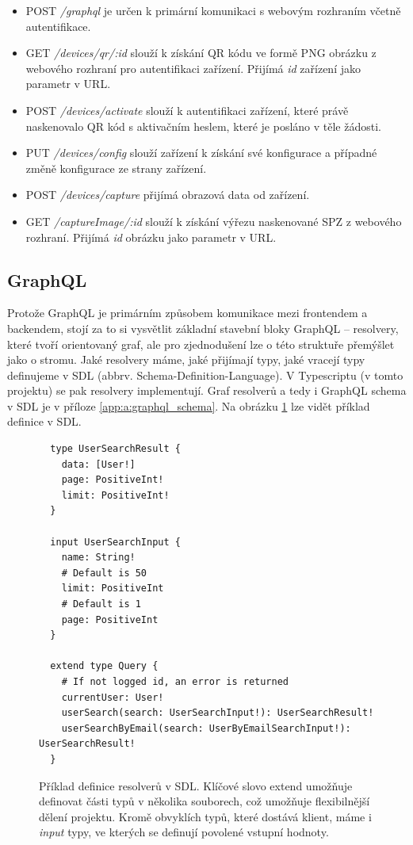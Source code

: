 \begin{itemize}
  \setlength\itemsep{.05em}
  \item POST \textit{/graphql} je určen k primární komunikaci s webovým rozhraním včetně autentifikace.
  \item GET \textit{/devices/qr/:id} slouží k získání QR kódu ve formě PNG obrázku z webového rozhraní pro autentifikaci zařízení.
        Přijímá \textit{id} zařízení jako parametr v URL.
  \item POST \textit{/devices/activate} slouží k autentifikaci zařízení, které právě naskenovalo QR kód s aktivačním heslem, které je posláno v těle žádosti.
  \item PUT \textit{/devices/config} slouží zařízení k získání své konfigurace a případné změně konfigurace ze strany zařízení.
  \item POST \textit{/devices/capture} přijímá obrazová data od zařízení.
  \item GET \textit{/captureImage/:id} slouží k získání výřezu naskenované SPZ z webového rozhraní. Přijímá \textit{id} obrázku jako parametr v URL.
\end{itemize}

\subsection{GraphQL}

\noindent
Protože GraphQL je primárním způsobem komunikace mezi frontendem a backendem, stojí za to si vysvětlit základní stavební bloky
GraphQL -- resolvery, které tvoří orientovaný graf, ale pro zjednodušení lze o této struktuře přemýšlet jako o stromu.
Jaké resolvery máme, jaké přijímají typy, jaké vracejí typy definujeme v SDL (abbrv. Schema-Definition-Language).
V Typescriptu (v tomto projektu) se pak resolvery implementují.
Graf resolverů a tedy i GraphQL schema v SDL je v příloze \ref{app:a:graphql_schema}.
Na obrázku \ref{fig:graphql_sdl} lze vidět příklad definice v SDL.

\begin{figure}[!htb]
  \lstset{language=GraphQL}
  \begin{lstlisting}
  type UserSearchResult {
    data: [User!]
    page: PositiveInt!
    limit: PositiveInt!
  }

  input UserSearchInput {
    name: String!
    # Default is 50
    limit: PositiveInt
    # Default is 1
    page: PositiveInt
  }

  extend type Query {
    # If not logged id, an error is returned
    currentUser: User!
    userSearch(search: UserSearchInput!): UserSearchResult!
    userSearchByEmail(search: UserByEmailSearchInput!): UserSearchResult!
  }
  \end{lstlisting}
  \caption[Příklad definice resolverů v SDL.]{Příklad definice resolverů v SDL. Klíčové slovo extend umožňuje
  definovat části typů v několika souborech, což umožňuje flexibilnější dělení projektu. Kromě obvyklích typů,
  které dostává klient, máme i \textit{input} typy, ve kterých se definují povolené vstupní hodnoty.}
  \label{fig:graphql_sdl}
\end{figure}

